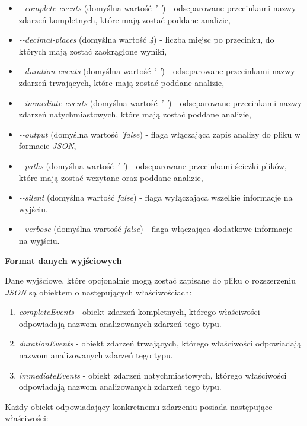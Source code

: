 \documentclass[polish, twoside, 12pt]{mwart}
\begin{document}
\begin{itemize}
  \item \emph{-{}-complete-events} (domyślna wartość \emph{' '}) - odseparowane przecinkami nazwy zdarzeń kompletnych, które mają zostać poddane analizie,
  \item \emph{-{}-decimal-places} (domyślna wartość \emph{4}) - liczba miejsc po przecinku, do których mają zostać zaokrąglone wyniki,
  \item \emph{-{}-duration-events} (domyślna wartość \emph{' '}) - odseparowane przecinkami nazwy zdarzeń trwających, które mają zostać poddane analizie,
  \item \emph{-{}-immediate-events} (domyślna wartość \emph{' '}) - odseparowane przecinkami nazwy zdarzeń natychmiastowych, które mają zostać poddane analizie,
  \item \emph{-{}-output} (domyślna wartość \emph{'false}) - flaga włączająca zapis analizy do pliku w formacie \emph{JSON},
  \item \emph{-{}-paths} (domyślna wartość \emph{' '}) - odseparowane przecinkami ścieżki plików, które mają zostać wczytane oraz poddane analizie,
  \item \emph{-{}-silent} (domyślna wartość \emph{false}) - flaga wyłączająca wszelkie informacje na wyjściu,
  \item \emph{-{}-verbose} (domyślna wartość \emph{false}) - flaga włączająca dodatkowe informacje na wyjściu.
\end{itemize}

\textbf{Format danych wyjściowych} \newline

Dane wyjściowe, które opcjonalnie mogą zostać zapisane do pliku o rozszerzeniu \emph{JSON} są obiektem o następujących właściwościach:

\begin{enumerate}
  \item \emph{completeEvents} - obiekt zdarzeń kompletnych, którego właściwości odpowiadają nazwom analizowanych zdarzeń tego typu.
  \item \emph{durationEvents} - obiekt zdarzeń trwających, którego właściwości odpowiadają nazwom analizowanych zdarzeń tego typu.
  \item \emph{immediateEvents} - obiekt zdarzeń natychmiastowych, którego właściwości odpowiadają nazwom analizowanych zdarzeń tego typu.
\end{enumerate}

Każdy obiekt odpowiadający konkretnemu zdarzeniu posiada następujące właściwości:
\end{document}
